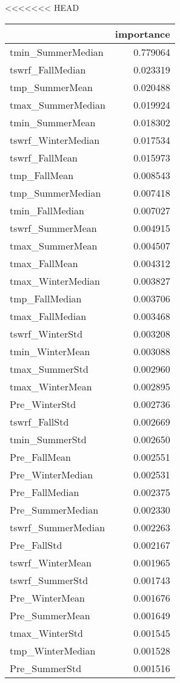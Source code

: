 <<<<<<< HEAD
\begin{tabular}{lr}
\toprule
 & importance \\
\midrule
tmin_SummerMedian & 0.779064 \\
tswrf_FallMedian & 0.023319 \\
tmp_SummerMean & 0.020488 \\
tmax_SummerMedian & 0.019924 \\
tmin_SummerMean & 0.018302 \\
tswrf_WinterMedian & 0.017534 \\
tswrf_FallMean & 0.015973 \\
tmp_FallMean & 0.008543 \\
tmp_SummerMedian & 0.007418 \\
tmin_FallMedian & 0.007027 \\
tswrf_SummerMean & 0.004915 \\
tmax_SummerMean & 0.004507 \\
tmax_FallMean & 0.004312 \\
tmax_WinterMedian & 0.003827 \\
tmp_FallMedian & 0.003706 \\
tmax_FallMedian & 0.003468 \\
tswrf_WinterStd & 0.003208 \\
tmin_WinterMean & 0.003088 \\
tmax_SummerStd & 0.002960 \\
tmax_WinterMean & 0.002895 \\
Pre_WinterStd & 0.002736 \\
tswrf_FallStd & 0.002669 \\
tmin_SummerStd & 0.002650 \\
Pre_FallMean & 0.002551 \\
Pre_WinterMedian & 0.002531 \\
Pre_FallMedian & 0.002375 \\
Pre_SummerMedian & 0.002330 \\
tswrf_SummerMedian & 0.002263 \\
Pre_FallStd & 0.002167 \\
tswrf_WinterMean & 0.001965 \\
tswrf_SummerStd & 0.001743 \\
Pre_WinterMean & 0.001676 \\
Pre_SummerMean & 0.001649 \\
tmax_WinterStd & 0.001545 \\
tmp_WinterMedian & 0.001528 \\
Pre_SummerStd & 0.001516 \\

\end{tabular}
